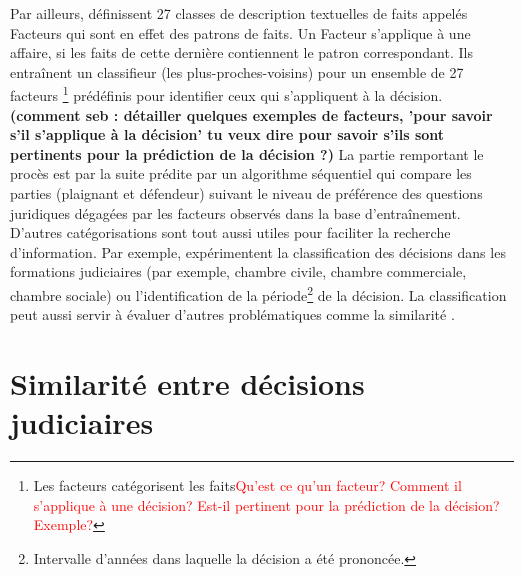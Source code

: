 Par ailleurs, \cite{Ashley2009classifCases} définissent 27 classes de description textuelles de faits appelés \og Facteurs \fg{} qui sont en effet des patrons de faits. Un Facteur s'applique à une affaire, si les faits de cette dernière contiennent le patron correspondant.  Ils entraînent un classifieur (les plus-proches-voisins) pour un ensemble de 27 facteurs \footnote{Les facteurs catégorisent les faits\textcolor{red}{Qu'est ce qu'un facteur? Comment il s'applique à une décision? Est-il pertinent pour la prédiction de la décision? Exemple?}} prédéfinis pour identifier ceux qui s'appliquent à la décision. 
\textbf{(comment seb : détailler quelques exemples de facteurs, 'pour savoir s'il s'applique à la décision' tu veux dire pour savoir s'ils sont pertinents pour la prédiction de la décision ?)} 
La partie remportant le procès est par la suite prédite par un algorithme séquentiel qui compare les parties (plaignant et défendeur) suivant le niveau de préférence des questions juridiques dégagées par les facteurs observés dans la base d'entraînement. D'autres catégorisations sont tout aussi utiles pour faciliter la recherche d'information. Par exemple, \citet{Sulea2017predictareadecision,sulea2017legalEnsSVM} expérimentent la classification des décisions dans les formations judiciaires (par exemple, chambre civile, chambre commerciale, chambre sociale) ou l'identification de la période\footnote{Intervalle d'années dans laquelle la décision a été prononcée.} de la décision. 
 La classification peut aussi servir à évaluer d'autres problématiques comme la similarité \citep{ma2018wmdchinesecase}.

\section{Similarité entre décisions judiciaires}


